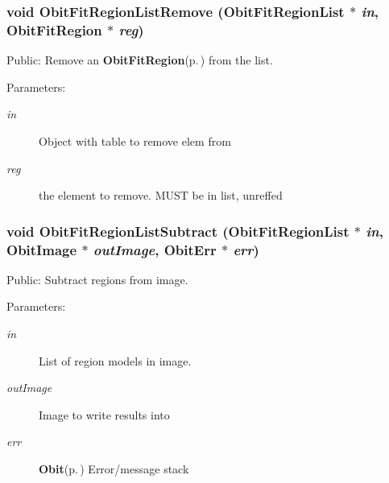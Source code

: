 \subsubsection{\setlength{\rightskip}{0pt plus 5cm}void Obit\-Fit\-Region\-List\-Remove ({\bf Obit\-Fit\-Region\-List} $\ast$ {\em in}, {\bf Obit\-Fit\-Region} $\ast$ {\em reg})}\label{ObitFitRegionList_8c_a11}


Public: Remove an {\bf Obit\-Fit\-Region}{\rm (p.\,\pageref{structObitFitRegion})} from the list. 

\begin{Desc}
\item[Parameters:]
\begin{description}
\item[{\em in}]Object with table to remove elem from \item[{\em reg}]the element to remove. MUST be in list, unreffed \end{description}
\end{Desc}
\subsubsection{\setlength{\rightskip}{0pt plus 5cm}void Obit\-Fit\-Region\-List\-Subtract ({\bf Obit\-Fit\-Region\-List} $\ast$ {\em in}, {\bf Obit\-Image} $\ast$ {\em out\-Image}, {\bf Obit\-Err} $\ast$ {\em err})}\label{ObitFitRegionList_8c_a9}


Public: Subtract regions from image. 

\begin{Desc}
\item[Parameters:]
\begin{description}
\item[{\em in}]List of region models in image. \item[{\em out\-Image}]Image to write results into \item[{\em err}]{\bf Obit}{\rm (p.\,\pageref{structObit})} Error/message stack \end{description}
\end{Desc}
